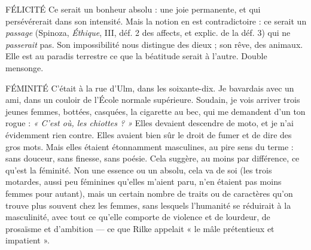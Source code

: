 FÉLICITÉ Ce serait un bonheur absolu : une joie permanente, et qui persévérerait
dans son intensité. Mais la notion en est contradictoire :
ce serait un {\it passage} (Spinoza, {\it Éthique}, III, déf. 2 des affects, et explic. de la
déf. 3) qui ne {\it passerait} pas. Son impossibilité nous distingue des dieux ; son
rêve, des animaux. Elle est au paradis terrestre ce que la béatitude serait à
l'autre. Double mensonge.

FÉMINITÉ C'était à la rue d’Ulm, dans les soixante-dix. Je bavardais avec
un ami, dans un couloir de l’École normale supérieure. Soudain,
je vois arriver trois jeunes femmes, bottées, casquées, la cigarette au bec,
qui me demandent d’un ton rogue : {\it « C'est où, les chiottes ? »} Elles devaient descendre
de moto, et je n’ai évidemment rien contre. Elles avaient bien sûr le
droit de fumer et de dire des gros mots. Mais elles étaient étonnamment masculines,
au pire sens du terme : sans douceur, sans finesse, sans poésie. Cela
suggère, au moins par différence, ce qu'est la féminité. Non une essence ou un
absolu, cela va de soi (les trois motardes, aussi peu féminines qu’elles m’aient
paru, n’en étaient pas moins femmes pour autant), mais un certain nombre de
traits ou de caractères qu’on trouve plus souvent chez les femmes, sans lesquels
l'humanité se réduirait à la masculinité, avec tout ce qu’elle comporte de violence
et de lourdeur, de prosaïsme et d’ambition — ce que Rilke appelait « le
mâle prétentieux et impatient ».


